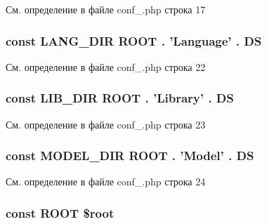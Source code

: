 См. определение в файле conf\-\_\-.\-php строка 17

\hypertarget{conf___8php_a62485aa7dd0bdd2703aa8fb69d2ff5d8}{
\subsubsection[{L\-A\-N\-G\-\_\-\-D\-I\-R}]{\setlength{\rightskip}{0pt plus 5cm}const L\-A\-N\-G\-\_\-\-D\-I\-R {\bf R\-O\-O\-T} . 'Language' . {\bf D\-S}}}\label{conf___8php_a62485aa7dd0bdd2703aa8fb69d2ff5d8}


См. определение в файле conf\-\_\-.\-php строка 22

\hypertarget{conf___8php_aab9895f0433c9fc8f6980e22ddecbbd2}{
\subsubsection[{L\-I\-B\-\_\-\-D\-I\-R}]{\setlength{\rightskip}{0pt plus 5cm}const L\-I\-B\-\_\-\-D\-I\-R {\bf R\-O\-O\-T} . 'Library' . {\bf D\-S}}}\label{conf___8php_aab9895f0433c9fc8f6980e22ddecbbd2}


См. определение в файле conf\-\_\-.\-php строка 23

\hypertarget{conf___8php_af1b1241d1e4dfde50cb4cff4e42a4a06}{
\subsubsection[{M\-O\-D\-E\-L\-\_\-\-D\-I\-R}]{\setlength{\rightskip}{0pt plus 5cm}const M\-O\-D\-E\-L\-\_\-\-D\-I\-R {\bf R\-O\-O\-T} . 'Model' . {\bf D\-S}}}\label{conf___8php_af1b1241d1e4dfde50cb4cff4e42a4a06}


См. определение в файле conf\-\_\-.\-php строка 24

\hypertarget{conf___8php_a18c0644836e196aed6d63779e14d6bd8}{
\subsubsection[{R\-O\-O\-T}]{\setlength{\rightskip}{0pt plus 5cm}const R\-O\-O\-T \$root}}\label{conf___8php_a18c0644836e196aed6d63779e14d6bd8}


